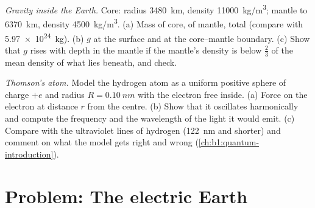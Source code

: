 \begin{exercise}[$\star\star\star$]\label{exo:b1:electrostatics-gauss:11}
\emph{Gravity inside the Earth.} Core: radius \qty{3480}{km}, density
\qty{11000}{kg/m^3}; mantle to \qty{6370}{km}, density \qty{4500}{kg/m^3}.
(a) Mass of core, of mantle, total (compare with \qty{5.97e24}{kg}).
(b) $g$ at the surface and at the core--mantle boundary. (c) Show that
$g$ rises with depth in the mantle if the mantle's density is below
$\tfrac23$ of the mean density of what lies beneath, and check.
\end{exercise}

\begin{exercise}[$\star\star\star$]\label{exo:b1:electrostatics-gauss:12}
\emph{Thomson's atom.} Model the hydrogen atom as a uniform positive
sphere of charge $+e$ and radius $R = \qty{0.10}{nm}$ with the electron
free inside. (a) Force on the electron at distance $r$ from the centre.
(b) Show that it oscillates harmonically and compute the frequency and
the wavelength of the light it would emit. (c) Compare with the
ultraviolet lines of hydrogen (\qty{122}{nm} and shorter) and comment on
what the model gets right and wrong (\cref{ch:b1:quantum-introduction}).
\end{exercise}

\section{Problem: The electric Earth}

